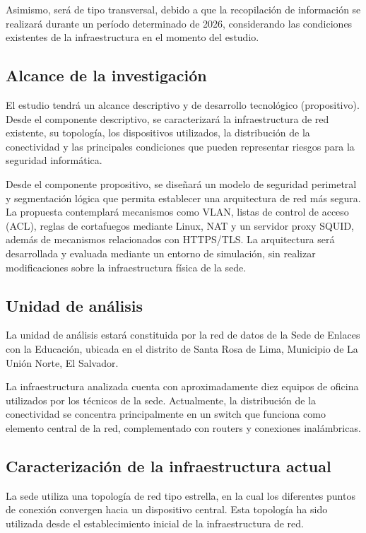 Asimismo, será de tipo transversal, debido a que la recopilación de información se realizará durante un período determinado de 2026, considerando las condiciones existentes de la infraestructura en el momento del estudio.

\subsection{Alcance de la investigación}

El estudio tendrá un alcance descriptivo y de desarrollo tecnológico (propositivo). Desde el componente descriptivo, se caracterizará la infraestructura de red existente, su topología, los dispositivos utilizados, la distribución de la conectividad y las principales condiciones que pueden representar riesgos para la seguridad informática.

Desde el componente propositivo, se diseñará un modelo de seguridad perimetral y segmentación lógica que permita establecer una arquitectura de red más segura. La propuesta contemplará mecanismos como VLAN, listas de control de acceso (ACL), reglas de cortafuegos mediante Linux, NAT y un servidor proxy SQUID, además de mecanismos relacionados con HTTPS/TLS. La arquitectura será desarrollada y evaluada mediante un entorno de simulación, sin realizar modificaciones sobre la infraestructura física de la sede.

\subsection{Unidad de análisis}

La unidad de análisis estará constituida por la red de datos de la Sede de Enlaces con la Educación, ubicada en el distrito de Santa Rosa de Lima, Municipio de La Unión Norte, El Salvador.

La infraestructura analizada cuenta con aproximadamente diez equipos de oficina utilizados por los técnicos de la sede. Actualmente, la distribución de la conectividad se concentra principalmente en un switch que funciona como elemento central de la red, complementado con routers y conexiones inalámbricas.

\subsection{Caracterización de la infraestructura actual}

La sede utiliza una topología de red tipo estrella, en la cual los diferentes puntos de conexión convergen hacia un dispositivo central. Esta topología ha sido utilizada desde el establecimiento inicial de la infraestructura de red.

